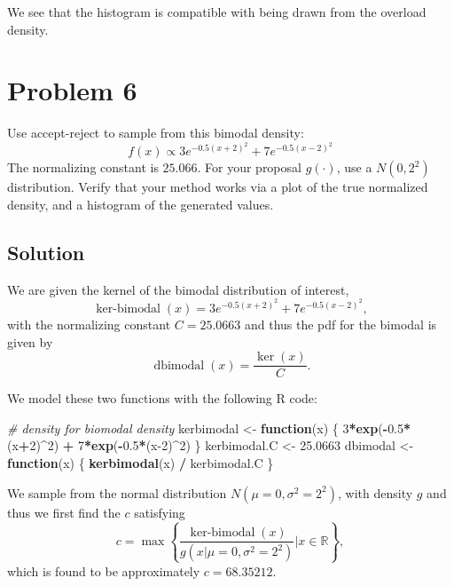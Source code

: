 \documentclass[
]{article}
\newenvironment{Shaded}{\begin{snugshade}}{\end{snugshade}}
\newcommand{\CommentTok}[1]{\textcolor[rgb]{0.56,0.35,0.01}{\textit{#1}}}
\newcommand{\ControlFlowTok}[1]{\textcolor[rgb]{0.13,0.29,0.53}{\textbf{#1}}}
\newcommand{\DecValTok}[1]{\textcolor[rgb]{0.00,0.00,0.81}{#1}}
\newcommand{\FloatTok}[1]{\textcolor[rgb]{0.00,0.00,0.81}{#1}}
\newcommand{\FunctionTok}[1]{\textcolor[rgb]{0.13,0.29,0.53}{\textbf{#1}}}
\newcommand{\NormalTok}[1]{#1}
\newcommand{\OtherTok}[1]{\textcolor[rgb]{0.56,0.35,0.01}{#1}}
\newcommand{\SpecialCharTok}[1]{\textcolor[rgb]{0.81,0.36,0.00}{\textbf{#1}}}
\begin{document}
We see that the histogram is compatible with being drawn from the
overload density.

\hypertarget{problem-6}{%
\section{Problem 6}\label{problem-6}}

Use accept-reject to sample from this bimodal density: \[
  f(x) \propto 3 e^{-0.5(x+2)^2} + 7 e^{-0.5(x-2)^2}
\] The normalizing constant is \(25.066\). For your proposal \(g(·)\),
use a \(N(0, 2^2)\) distribution. Verify that your method works via a
plot of the true normalized density, and a histogram of the generated
values.

\hypertarget{solution-3}{%
\subsection{Solution}\label{solution-3}}

We are given the kernel of the bimodal distribution of interest, \[
  \operatorname{ker-bimodal}(x) = 3 e^{-0.5(x+2)^2} + 7 e^{-0.5(x-2)^2},
\] with the normalizing constant \(C = 25.0663\) and thus the pdf for
the bimodal is given by \[
  \operatorname{dbimodal}(x) = \frac{\operatorname{ker}(x)}{C}.
\]

We model these two functions with the following R code:

\begin{Shaded}
\begin{Highlighting}[]
\CommentTok{\# density for biomodal density}
\NormalTok{kerbimodal }\OtherTok{\textless{}{-}} \ControlFlowTok{function}\NormalTok{(x) \{ }\DecValTok{3}\SpecialCharTok{*}\FunctionTok{exp}\NormalTok{(}\SpecialCharTok{{-}}\FloatTok{0.5}\SpecialCharTok{*}\NormalTok{(x}\SpecialCharTok{+}\DecValTok{2}\NormalTok{)}\SpecialCharTok{\^{}}\DecValTok{2}\NormalTok{) }\SpecialCharTok{+} \DecValTok{7}\SpecialCharTok{*}\FunctionTok{exp}\NormalTok{(}\SpecialCharTok{{-}}\FloatTok{0.5}\SpecialCharTok{*}\NormalTok{(x}\DecValTok{{-}2}\NormalTok{)}\SpecialCharTok{\^{}}\DecValTok{2}\NormalTok{) \}}
\NormalTok{kerbimodal.C }\OtherTok{\textless{}{-}} \FloatTok{25.0663}
\NormalTok{dbimodal }\OtherTok{\textless{}{-}} \ControlFlowTok{function}\NormalTok{(x) \{ }\FunctionTok{kerbimodal}\NormalTok{(x) }\SpecialCharTok{/}\NormalTok{ kerbimodal.C \}}
\end{Highlighting}
\end{Shaded}

We sample from the normal distribution \(N(\mu=0,\sigma^2=2^2)\), with
density \(g\) and thus we first find the \(c\) satisfying \[
  c = \max \left\{ \frac{\operatorname{ker-bimodal}(x)}{g(x|\mu=0,\sigma^2=2^2)} | x \in \mathbb{R} \right\},
\] which is found to be approximately \(c = 68.35212\).
\end{document}
